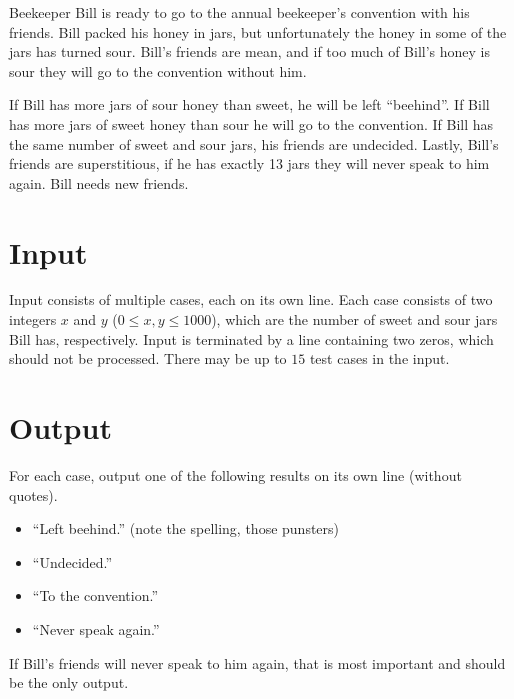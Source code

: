 

Beekeeper Bill is ready to go to the annual beekeeper's convention with
his friends. Bill packed his honey in jars, but unfortunately the honey in
some of the jars has turned sour. Bill's friends are mean, and if too much
of Bill's honey is sour they will go to the convention without him.

If Bill has more jars of sour honey than sweet, he will be left ``beehind''.
If Bill has more jars of sweet honey than sour he will go to the convention.
If Bill has the same number of sweet and sour jars, his friends are
undecided. Lastly, Bill's friends are superstitious, if he has exactly 13 jars
they will never speak to him again. Bill needs new friends.

\section*{Input}

Input consists of multiple cases, each on its own line. Each case consists of two integers $x$ and $y$
($0 \le x, y \le 1000$), which are the number of sweet and sour jars Bill has, respectively.
Input is terminated by a line containing two zeros, which should not be processed.
There may be up to $15$ test cases in the input.

\section*{Output}

For each case, output one of the following results on its own line (without quotes).
\begin{itemize}
    \item ``Left beehind.'' (note the spelling, those punsters)
    \item ``Undecided.''
    \item ``To the convention.''
    \item ``Never speak again.''
\end{itemize}
If Bill's friends will never speak to him again, that is most important and should be the only
output.
